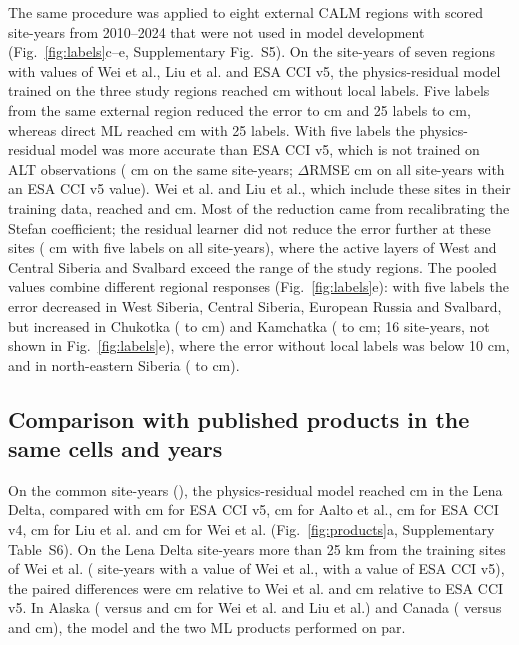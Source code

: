 The same procedure was applied to eight external CALM regions with \nftScoredRows{} scored site-years from 2010--2024 that were not used in model development (Fig.~\ref{fig:labels}c--e, Supplementary Fig.~S5). On the \nftrows{} site-years of seven regions with values of Wei et al., Liu et al. and ESA CCI v5, the physics-residual model trained on the three study regions reached \nftAllRszero{} cm without local labels. Five labels from the same external region reduced the error to \nftAllRsfive{} cm and 25 labels to \nftAllRstwfive{} cm, whereas direct ML reached \nftAllDstwfive{} cm with 25 labels. With five labels the physics-residual model was more accurate than ESA CCI v5, which is not trained on ALT observations (\nftAllCcifivezero{} cm on the same \nftrows{} site-years; $\Delta$RMSE \nftdRsCcifivefive{} cm on all \nftdCciRows{} site-years with an ESA CCI v5 value). Wei et al. and Liu et al., which include these sites in their training data, reached \nftAllWeizero{} and \nftAllLiuzero{} cm. Most of the reduction came from recalibrating the Stefan coefficient; the residual learner did not reduce the error further at these sites (\nftdRsPnfive{} cm with five labels on all \nftScoredRows{} site-years), where the active layers of West and Central Siberia and Svalbard exceed the range of the study regions. The pooled values combine different regional responses (Fig.~\ref{fig:labels}e): with five labels the error decreased in West Siberia, Central Siberia, European Russia and Svalbard, but increased in Chukotka (\nftChRszero{} to \nftChRsfive{} cm) and Kamchatka (\nftKaRszero{} to \nftKaRsfive{} cm; 16 site-years, not shown in Fig.~\ref{fig:labels}e), where the error without local labels was below 10 cm, and in north-eastern Siberia (\nftNsRszero{} to \nftNsRsfive{} cm).

\subsection{Comparison with published products in the same cells and years}
On the common site-years (\nyrscc), the physics-residual model reached \nccLeRoall{} cm in the Lena Delta, compared with \nccLeCcifiveall{} cm for ESA CCI v5, \nccLeAaltoall{} cm for Aalto et al., \nccLeCcifourall{} cm for ESA CCI v4, \nccLeLiuall{} cm for Liu et al. and \nccLeWeiall{} cm for Wei et al. (Fig.~\ref{fig:products}a, Supplementary Table~S6). On the Lena Delta site-years more than 25 km from the training sites of Wei et al. (\nnprodLeweimask{} site-years with a value of Wei et al., \nnprodLeccifivemask{} with a value of ESA CCI v5), the paired differences were \ndprodLeweiRomask{} cm relative to Wei et al. and \ndprodLeccifiveRomask{} cm relative to ESA CCI v5. In Alaska (\nccAkRoall{} versus \nccAkWeiall{} and \nccAkLiuall{} cm for Wei et al. and Liu et al.) and Canada (\nccCaRoall{} versus \nccCaWeiall{} and \nccCaLiuall{} cm), the model and the two ML products performed on par.

